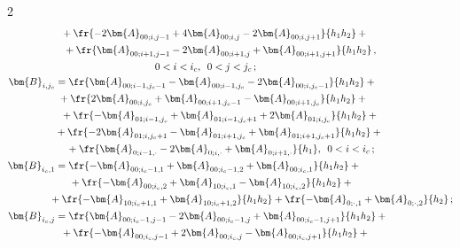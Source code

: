 \begin{multicols}{2}
\begin{align*}
  &\hspace*{2mm}{}+ \fr{- 2\bm{A}_{00;i,j-1} + 4\bm{A}_{00;i,j} - 2\bm{A}_{00;i,j+1}}{h_1h_2} +{}\\


&\hspace*{3mm}{}+\fr{\bm{A}_{00;i+1,j-1} - 2\bm{A}_{00;i+1,j} + \bm{A}_{00;i+1,j+1}}{h_1h_2}\,,\\


    & \hspace*{35mm}0<i<i_c,\enskip  0<j<j_c\,; \\


  \bm{B}_{i,j_c}&=\fr{\bm{A}_{00;i-1,j_c-1} - \bm{A}_{00;i-1,j_c} - 2\bm{A}_{00;i,j_c-1}}{h_1h_2} +{} \\


 &\hspace*{1mm}{}+\fr{2\bm{A}_{00;i,j_c} + \bm{A}_{00;i+1,j_c-1} - \bm{A}_{00;i+1,j_c}}{h_1h_2}+{}\\


 &\hspace*{2mm}{}+ \fr{ -\bm{A}_{01;i-1,j_c} + \bm{A}_{01;i-1,j_c+1} + 2\bm{A}_{01;i,j_c}}{h_1h_2}+{}\\


& {}+\fr{ - 2\bm{A}_{01;i,j_c+1} - \bm{A}_{01;i+1,j_c} + \bm{A}_{01;i+1,j_c+1}}{h_1h_2} +{}\\


&\hspace*{4mm}{}+ \fr{\bm{A}_{0;i-1,\cdot} - 2\bm{A}_{0;i,\cdot} + \bm{A}_{0;i+1,\cdot}}{h_1},\enskip    0<i<i_c\,; \\


  \bm{B}_{i_c,1}&=\fr{-\bm{A}_{00;i_c-1,1} + \bm{A}_{00;i_c-1,2} + \bm{A}_{00;i_c,1}}{h_1h_2}+{}\\


  &\hspace*{5mm}{}+ \fr{ -\bm{A}_{00; i_c,2} + \bm{A}_{10;i_c,1} - \bm{A}_{10;i_c,2}}{h_1 h_2}+{}\\


  &\hspace*{-2mm}{}+\fr{ - \bm{A}_{10;i_c+1,1} +\bm{A}_{10;i_c+1,2}}{h_1h_2} +   \fr{- \bm{A}_{0;\cdot,1} + \bm{A}_{0;\cdot,2}}{h_2}\,; \\


   \bm{B}_{i_c,j}&=\fr{\bm{A}_{00;i_c-1,j-1} - 2\bm{A}_{00;i_c-1,j} + \bm{A}_{00;i_c-1,j+1}}{h_1h_2} + {}\\


   &\hspace*{2mm}{}+   \fr{-\bm{A}_{00;i_c,j-1} + 2\bm{A}_{00;i_c,j} - \bm{A}_{00;i_c,j+1}}{h_1h_2}+{}\\



\end{align*}
\end{multicols}
